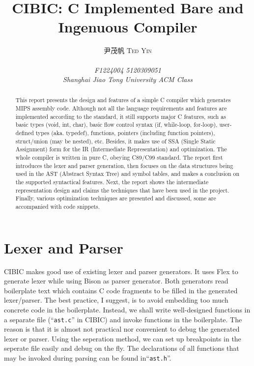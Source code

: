 \documentclass[10pt, a4paper]{article}
\begin{document}
\title{\Large{CIBIC: C Implemented Bare and Ingenuous Compiler}}

\author{\textsc{尹茂帆 Ted Yin}\\ \\
    {\centering\emph{F1224004 5120309051\\
Shanghai Jiao Tong University ACM Class}}}
\maketitle
\begin{abstract}
    This report presents the design and features of a simple C compiler which
    generates MIPS assembly code. Although not all the language requirements and
    features are implemented according to the standard, it still supports major
    C features, such as basic types (void, int, char), basic flow control syntax
    (if, while-loop, for-loop), user-defined types (aka. typedef), functions,
    pointers (including function pointers), struct/union (may be nested), etc.
    Besides, it makes use of SSA (Single Static Assignment) form for the IR
    (Intermediate Representation) and optimization. The whole compiler is
    written in pure C, obeying C89/C99 standard. The report first introduces the
    lexer and parser generation, then focuses on the data structures being used
    in the AST (Abstract Syntax Tree) and symbol tables, and makes a conclusion
    on the supported syntactical features. Next, the report shows the
    intermediate representation design and claims the techniques that have been
    used in the project. Finally, various optimization techniques are presented
    and discussed, some are accompanied with code snippets.
\end{abstract}
\tableofcontents
\section{Lexer and Parser}
CIBIC makes good use of existing lexer and parser generators. It uses Flex to
generate lexer while using Bison as parser generator. Both generators read
boilerplate text which contains C code fragments to be filled in the generated
lexer/parser. The best practice, I suggest, is to avoid embedding too much
concrete code in the boilerplate. Instead, we shall write well-designed
functions in a separate file (``\texttt{ast.c}'' in CIBIC) and invoke functions
in the boilerplate. The reason is that it is almost not practical nor
convenient to debug the generated lexer or parser. Using the seperation method,
we can set up breakpoints in the seperate file easily and debug on the fly. The
declarations of all functions that may be invoked during parsing can be found
in``\texttt{ast.h}''.
\end{document}
